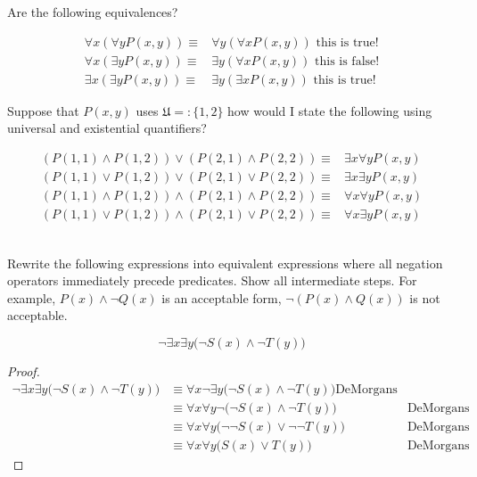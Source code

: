 \begin{exmp}
Are the following equivalences?

\begin{align}
\forall x (\forall y P(x,y))\equiv & \forall y (\forall x P(x,y)) \text{ this is true!}\\
\forall x (\exists y P(x,y))\equiv & \exists y (\forall x P(x,y)) \text{ this is false!}\\
\exists x (\exists y P(x,y))\equiv & \exists y (\exists x P(x,y)) \text{ this is true!}
\end{align}
\end{exmp}
\begin{exmp}
Suppose that $P(x,y)$ uses $\mathfrak{U}=:\{1,2\}$ how would I state the following using universal and existential quantifiers?


\begin{align}
(P(1,1)\land P(1,2))\lor(P(2,1) \land P(2,2))\equiv & \exists x \forall y P(x,y)\\
(P(1,1)\lor P(1,2))\lor(P(2,1) \lor P(2,2))\equiv & \exists x \exists y P(x,y)\\
(P(1,1)\land P(1,2))\land(P(2,1) \land P(2,2))\equiv &\forall x \forall y P(x,y)\\
(P(1,1)\lor P(1,2))\land(P(2,1) \lor P(2,2))\equiv &\forall x \exists y P(x,y)
\end{align}
\end{exmp}
\newpage
\begin{exmp}[]\ \\
Rewrite the following expressions into equivalent expressions where all negation operators immediately precede predicates. Show all intermediate steps. For example, $P(x) \land \lnot Q(x)$ is an acceptable form, $\lnot(P(x) \land Q(x))$ is not acceptable.

    \[\lnot \exists x \exists y \bigl( \lnot S(x) \land \lnot T(y) \bigr)\]
    \vspace{3cm}
\begin{proof}
 \begin{align}
\lnot \exists x \exists y \bigl( \lnot S(x) \land \lnot T(y) \bigr)&\equiv \forall x \lnot \exists y \bigl( \lnot S(x) \land \lnot T(y) \bigr)\text{DeMorgans}\\
&\equiv \forall x \forall y \lnot  \bigl( \lnot S(x) \land \lnot T(y) \bigr)&\text{DeMorgans}\\
&\equiv \forall x \forall y  \bigl( \lnot \lnot S(x) \lor \lnot \lnot T(y) \bigr)&\text{DeMorgans}\\
&\equiv \forall x \forall y  \bigl( S(x) \lor T(y) \bigr)&\text{DeMorgans}
 \end{align}
\end{proof}
\end{exmp}
